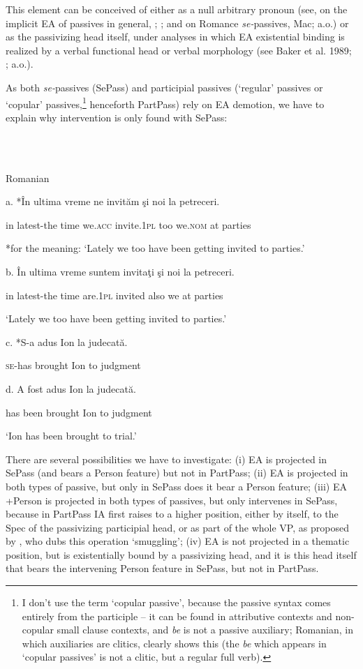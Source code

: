 \documentclass[output=paper]{langsci/langscibook}
\begin{document}
This element can be conceived of either as a null arbitrary pronoun (see, on the implicit EA of passives in general, \citealt{Collins2005}; \citealt{Landau2010}; and on Romance \textit{se-}passives, Mac\citealt{Donald2017}; a.o.) or as the passivizing head itself, under analyses in which EA existential binding is realized by a verbal functional head or verbal morphology (see Baker et al. 1989; \citealt{Bruening2012}; a.o.).

As both \textit{se-}passives (SePass) and participial passives (‘regular’ passives or ‘copular’ passives,\footnote{I don’t use the term ‘copular passive’, because the passive syntax comes entirely from the participle – it can be found in attributive contexts and non-copular small clause contexts, and \textit{be} is not a passive auxiliary; Romanian, in which auxiliaries are clitics, clearly shows this (the \textit{be} which appears in ‘copular passives’ is not a clitic, but a regular full verb).} henceforth PartPass) rely on EA demotion, we have to explain why intervention is only found with SePass:

\ea%
    \label{ex:key:27}
    \gll\\
        \\
    \glt
    \z

          Romanian

a.   *În ultima     vreme ne     invităm     şi    noi       la petreceri.

              in latest-the time   we.\textsc{acc}  invite.\textsc{1pl}  too we.\textsc{nom} at parties

            *for the meaning: ‘Lately we too have been getting invited to parties.’

  b.   În ultima     vreme suntem    invitaţi   şi    noi  la petreceri.

        in latest-the time    are.1\textsc{pl}  invited  also we   at parties

                 ‘Lately we too have been getting invited to parties.’ 

  c.   *S-a     adus      Ion la judecată.

         \textsc{se-}has brought Ion to judgment

  d.   A   fost  adus       Ion la judecată.

        has been brought Ion to judgment

        ‘Ion has been brought to trial.’

There are several possibilities we have to investigate: (i) EA is projected in SePass (and bears a Person feature) but not in PartPass; (ii) EA is projected in both types of passive, but only in SePass does it bear a Person feature; (iii) EA +Person is projected in both types of passives, but only intervenes in SePass, because in PartPass IA first raises to a higher position, either by itself, to the Spec of the passivizing participial head, or as part of the whole VP, as proposed by \citet{Collins2005}, who dubs this operation ‘smuggling’; (iv) EA is not projected in a thematic position, but is existentially bound by a passivizing head, and it is this head itself that bears the intervening Person feature in SePass, but not in PartPass.
\end{document}
